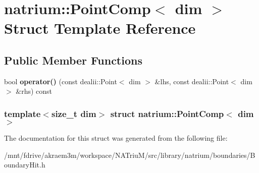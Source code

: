 \hypertarget{structnatrium_1_1PointComp}{
\section{natrium::PointComp$<$ dim $>$ Struct Template Reference}
\label{structnatrium_1_1PointComp}
}
\subsection*{Public Member Functions}
\begin{DoxyCompactItemize}
\item 
\hypertarget{structnatrium_1_1PointComp_a8bf0c2678fb1728de1d369d458044936}{
bool {\bfseries operator()} (const dealii::Point$<$ dim $>$ \&lhs, const dealii::Point$<$ dim $>$ \&rhs) const }
\label{structnatrium_1_1PointComp_a8bf0c2678fb1728de1d369d458044936}

\end{DoxyCompactItemize}
\subsubsection*{template$<$size\_\-t dim$>$ struct natrium::PointComp$<$ dim $>$}



The documentation for this struct was generated from the following file:\begin{DoxyCompactItemize}
\item 
/mnt/fdrive/akraem3m/workspace/NATriuM/src/library/natrium/boundaries/BoundaryHit.h\end{DoxyCompactItemize}
